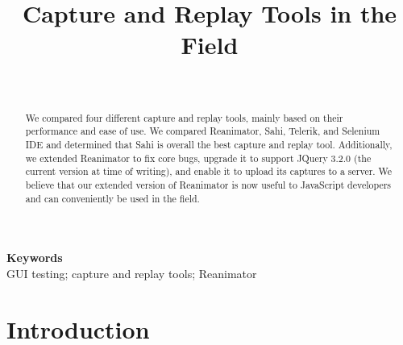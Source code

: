 \documentclass[12pt,journal]{IEEEtran}
\providecommand{\keywords}[1]{\textbf{Keywords} #1}
\begin{document}
\title{Capture and Replay Tools in the Field}

\author{\\
}

\maketitle

\begin{abstract}
We compared four different capture and replay tools, mainly based on their performance and ease of use. We compared Reanimator, Sahi, Telerik, and Selenium IDE and determined that Sahi is overall the best capture and replay tool. Additionally, we extended Reanimator to fix core bugs, upgrade it to support JQuery 3.2.0 (the current version at time of writing), and enable it to upload its captures to a server. We believe that our extended version of Reanimator is now useful to JavaScript developers and can conveniently be used in the field.
\end{abstract}

\keywords\\{GUI testing; capture and replay tools; Reanimator}

\section{Introduction}
\end{document}
